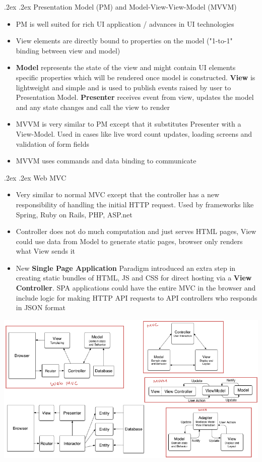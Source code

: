 \documentclass[10pt,landscape,a4paper]{article}
\makeatletter
\renewcommand{\subsection}{\@startsection{subsection}{1}{0mm}%
	{.2ex}%
	{.2ex}%
	{\sffamily\bfseries}}
\makeatother
\begin{document}
\begin{multicols*}{4}
		\subsection{Presentation Model (PM) and Model-View-View-Model (MVVM)}
		\begin{itemize}
			\item PM is well suited for rich UI application / advances in UI technologies
			\item View elements are directly bound to properties on the model ("1-to-1" binding between view and model)
			\item \textbf{Model} represents the state of the view and might contain UI elements specific properties which will be rendered once model is constructed. \textbf{View} is lightweight and simple and is used to publish events raised by user to Presentation Model. \textbf{Presenter} receives event from view, updates the model and any state changes and call the view to render
			\item MVVM is very similar to PM except that it substitutes Presenter with a View-Model. Used in cases like live word count updates, loading screens and validation of form fields
			\item MVVM uses commands and data binding to communicate
		\end{itemize}
		\subsection{Web MVC}
		\begin{itemize}
			\item Very similar to normal MVC except that the controller has a new responsibility of handling the initial HTTP request. Used by frameworks like Spring, Ruby on Rails, PHP, ASP.net
			\item Controller does not do much computation and just serves HTML pages, View could use data from Model to generate static pages, browser only renders what View sends it
			\item New \textbf{Single Page Application} Paradigm introduced an extra step in creating static bundles of HTML, JS and CSS for direct hosting via a \textbf{View Controller}. SPA applications could have the entire MVC in the browser and include logic for making HTTP API requests to API controllers who responds in JSON format
		\end{itemize}
		\begin{center}
			\includegraphics[width=0.6\columnwidth]{MV-star}
		\end{center}

\end{multicols*}
\end{document}
